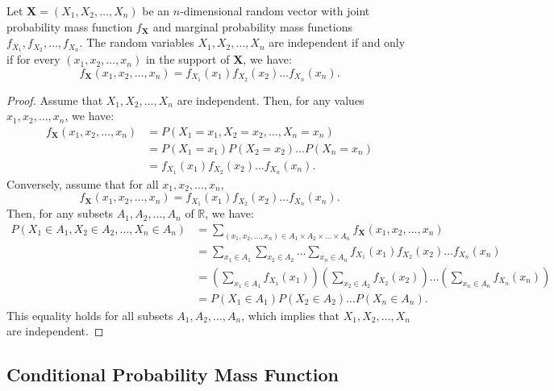 \begin{proposition}
Let $\mathbf{X} = (X_{1}, X_{2}, \ldots, X_{n})$ be an $n$-dimensional random vector with joint probability mass function $f_{\mathbf{X}}$ and marginal probability mass functions $f_{X_{1}}, f_{X_{2}}, \ldots, f_{X_{n}}$. The random variables $X_{1}, X_{2}, \ldots, X_{n}$ are independent if and only if for every $(x_{1}, x_{2}, \ldots, x_{n})$ in the support of $\mathbf{X}$, we have:
\[
f_{\mathbf{X}}(x_{1}, x_{2}, \ldots, x_{n}) = f_{X_{1}}(x_{1}) f_{X_{2}}(x_{2}) \ldots f_{X_{n}}(x_{n}).
\]
\end{proposition}
\begin{proof}
Assume that $X_{1}, X_{2}, \ldots, X_{n}$ are independent. Then, for any values $x_{1}, x_{2}, \ldots, x_{n}$, we have:
\[
\begin{aligned}
f_{\mathbf{X}}(x_{1}, x_{2}, \ldots, x_{n}) &= P(X_{1} = x_{1}, X_{2} = x_{2}, \ldots, X_{n} = x_{n}) \\
&= P(X_{1} = x_{1}) P(X_{2} = x_{2}) \ldots P(X_{n} = x_{n}) \\
&= f_{X_{1}}(x_{1}) f_{X_{2}}(x_{2}) \ldots f_{X_{n}}(x_{n}).
\end{aligned}
\]
Conversely, assume that for all $x_{1}, x_{2}, \ldots, x_{n}$,
\[
f_{\mathbf{X}}(x_{1}, x_{2}, \ldots, x_{n}) = f_{X_{1}}(x_{1}) f_{X_{2}}(x_{2}) \ldots f_{X_{n}}(x_{n}).
\]
Then, for any subsets $A_{1}, A_{2}, \ldots, A_{n}$ of $\mathbb{R}$, we have:
\[
\begin{aligned}
P\left( X_{1} \in A_{1}, X_{2} \in A_{2}, \ldots, X_{n} \in A_{n} \right) &= \sum_{(x_{1}, x_{2}, \ldots, x_{n}) \in A_{1} \times A_{2} \times \ldots \times A_{n}} f_{\mathbf{X}}(x_{1}, x_{2}, \ldots, x_{n}) \\
&= \sum_{x_{1} \in A_{1}} \sum_{x_{2} \in A_{2}} \ldots \sum_{x_{n} \in A_{n}} f_{X_{1}}(x_{1}) f_{X_{2}}(x_{2}) \ldots f_{X_{n}}(x_{n}) \\
&= \left( \sum_{x_{1} \in A_{1}} f_{X_{1}}(x_{1}) \right) \left( \sum_{x_{2} \in A_{2}} f_{X_{2}}(x_{2}) \right) \ldots \left( \sum_{x_{n} \in A_{n}} f_{X_{n}}(x_{n}) \right) \\
&= P(X_{1} \in A_{1}) P(X_{2} \in A_{2}) \ldots P(X_{n} \in A_{n}).
\end{aligned}
\]
This equality holds for all subsets $A_{1}, A_{2}, \ldots, A_{n}$, which implies that $X_{1}, X_{2}, \ldots, X_{n}$ are independent.
\end{proof}


\subsection{Conditional Probability Mass Function}

